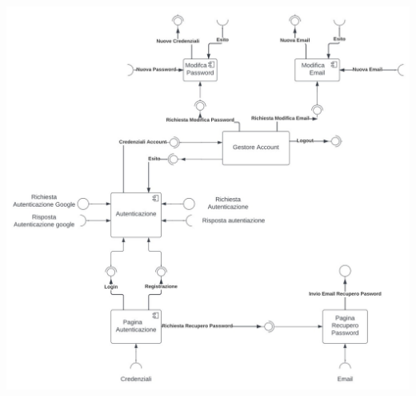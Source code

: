 \documentclass[11pt, a4paper]{article}
\theoremstyle{definition} %
\begin{document}
\begin{center}
    \hspace*{-1cm}
    \includegraphics[width=1.2\textwidth]{materiale/login-component.jpg}
\end{center}
    

    
\end{document}
